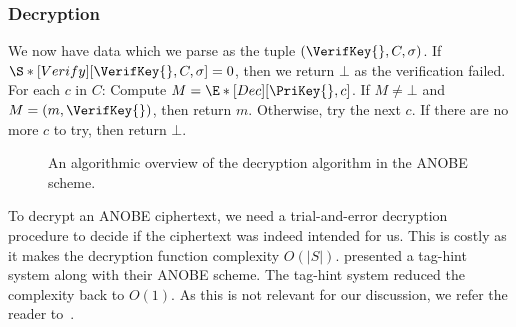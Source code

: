 \subsubsection{Decryption}

We now have data which we parse as the tuple \((\VerifKey{}, C, \sigma)\).
If \(\S*[Verify][\VerifKey{}, C, \sigma ] = 0\), then we return \(\bot\) as the 
verification failed.
For each \(c\) in \(C\):
Compute \(M = \E*[Dec][\PriKey{}, c ]\).
If \(M \neq \bot\) and \(M = (m, \VerifKey{})\), then return \(m\).
Otherwise, try the next \(c\).
If there are no more \(c\) to try, then return \(\bot\).

\begin{frame}
  \begin{figure}
    \caption{%
      An algorithmic overview of the decryption algorithm in the \ac{ANOBE} 
      scheme.
    }\label{DecANOBE}
  \end{figure}
\end{frame}

To decrypt an \ac{ANOBE} ciphertext, we need a trial-and-error decryption 
procedure to decide if the ciphertext was indeed intended for us.
This is costly as it makes the decryption function complexity \(O(|S|)\).
\citet{ANOBE} presented a tag-hint system along with their \ac{ANOBE} scheme.
The tag-hint system reduced the complexity back to \(O(1)\).
As this is not relevant for our discussion, we refer the reader 
to~\cite{ANOBE}.

